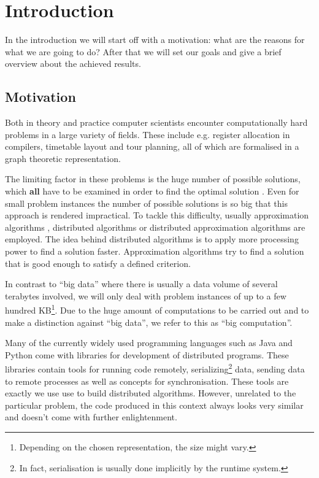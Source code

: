 \chapter{Introduction}
In the introduction we will start off with a motivation: what are the reasons for what we are going to do? After that we will set our goals and give a brief overview about the achieved results.

\section{Motivation}
Both in theory and practice computer scientists encounter computationally hard problems in a large variety of fields. These include e.g. register allocation in compilers, timetable layout and tour planning, all of which are formalised in a graph theoretic \cite{} representation.

The limiting factor in these problems is the huge number of possible solutions, which \textbf{all} have to be examined in order to find the optimal solution \cite{Garey:1979:CIG:578533}. Even for small problem instances the number of possible solutions is so big that this approach is rendered impractical. To tackle this difficulty, usually approximation algorithms \cite{}, distributed algorithms or distributed approximation algorithms are employed. The idea behind distributed algorithms is to apply more processing power to find a solution faster. Approximation algorithms try to find a solution that is good enough to satisfy a defined criterion.

In contrast to \enquote{big data} where there is usually a data volume of several terabytes involved, we will only deal with problem instances of up to a few hundred KB\footnote{Depending on the chosen representation, the size might vary.}. Due to the huge amount of computations to be carried out and to make a distinction against \enquote{big data}, we refer to this as \enquote{big computation}.

Many of the currently widely used programming languages such as Java and Python come with libraries for development of distributed programs. These libraries contain tools for running code remotely, serializing\footnote{In fact, serialisation is usually done implicitly by the runtime system.} data, sending data to remote processes as well as concepts for synchronisation. These tools are exactly we use use to build distributed algorithms. However, unrelated to the particular problem, the code produced in this context always looks very similar and doesn't come with further enlightenment.

